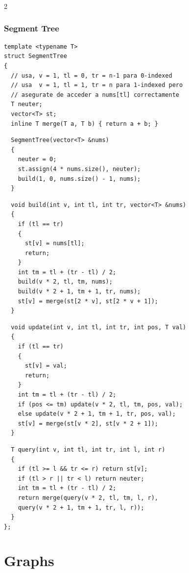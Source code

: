 \documentclass[twoside]{article}
\begin{document}
\begin{multicols*}{2}
{		\subsubsection*{Segment Tree}
	}
	\begin{verbatim}
template <typename T>
struct SegmentTree
{
  // usa, v = 1, tl = 0, tr = n-1 para 0-indexed
  // usa  v = 1, tl = 1, tr = n para 1-indexed pero 
  // asegurate de acceder a nums[tl] correctamente 
  T neuter;
  vector<T> st;
  inline T merge(T a, T b) { return a + b; }
\end{verbatim}
	\vspace{-12pt}
	\begin{verbatim}
  SegmentTree(vector<T> &nums)
  {
    neuter = 0;
    st.assign(4 * nums.size(), neuter);
    build(1, 0, nums.size() - 1, nums);
  }
\end{verbatim}
	\vspace{-12pt}
	\begin{verbatim}
  void build(int v, int tl, int tr, vector<T> &nums)
  {
    if (tl == tr)
    {
      st[v] = nums[tl];
      return;
    }
    int tm = tl + (tr - tl) / 2;
    build(v * 2, tl, tm, nums);
    build(v * 2 + 1, tm + 1, tr, nums);
    st[v] = merge(st[2 * v], st[2 * v + 1]);
  }
\end{verbatim}
	\vspace{-12pt}
	\begin{verbatim}
  void update(int v, int tl, int tr, int pos, T val)
  {
    if (tl == tr)
    {
      st[v] = val;
      return;
    }
    int tm = tl + (tr - tl) / 2;
    if (pos <= tm) update(v * 2, tl, tm, pos, val);
    else update(v * 2 + 1, tm + 1, tr, pos, val);
    st[v] = merge(st[v * 2], st[v * 2 + 1]);
  }
\end{verbatim}
	\vspace{-12pt}
	\begin{verbatim}
  T query(int v, int tl, int tr, int l, int r)
  {
    if (tl >= l && tr <= r) return st[v];
    if (tl > r || tr < l) return neuter;
    int tm = tl + (tr - tl) / 2;
    return merge(query(v * 2, tl, tm, l, r), 
    query(v * 2 + 1, tm + 1, tr, l, r));
  }
};

\end{verbatim}

	{
		\section*{Graphs}
	}
	{
}
\end{multicols*}
\end{document}
